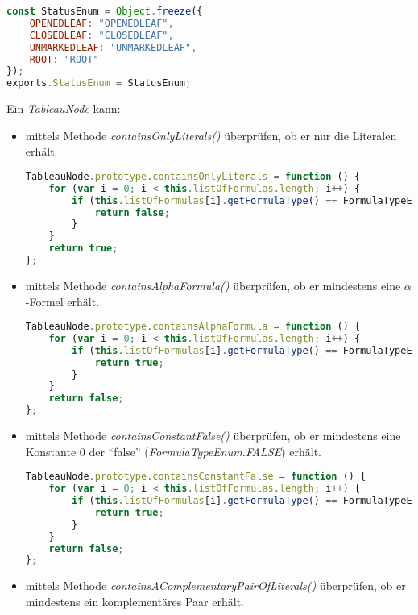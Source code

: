 \begin{lstlisting}[language=JavaScript, caption= StatusEnum, basicstyle=\scriptsize]
const StatusEnum = Object.freeze({
    OPENEDLEAF: "OPENEDLEAF",
    CLOSEDLEAF: "CLOSEDLEAF",
    UNMARKEDLEAF: "UNMARKEDLEAF",
    ROOT: "ROOT"
});
exports.StatusEnum = StatusEnum;
\end{lstlisting}

Ein \textit{TableauNode} kann:
\begin{itemize}
\item	mittels Methode \textit{containsOnlyLiterals()} überprüfen, ob er nur die Literalen erhält.
\begin{lstlisting}[language=JavaScript, caption= containsOnlyLiterals() (Klasse TableauNode), basicstyle=\scriptsize]
TableauNode.prototype.containsOnlyLiterals = function () {
    for (var i = 0; i < this.listOfFormulas.length; i++) {
        if (this.listOfFormulas[i].getFormulaType() == FormulaTypeEnum.ALPHA || this.listOfFormulas[i].getFormulaType() == FormulaTypeEnum.BETA) {
            return false;
        }
    }
    return true;
};
\end{lstlisting}
\item	mittels Methode \textit{containsAlphaFormula()} überprüfen, ob er mindestens eine $\alpha$-Formel erhält. 
\begin{lstlisting}[language=JavaScript, caption= containsAlphaFormula() (Klasse TableauNode), basicstyle=\scriptsize] 
TableauNode.prototype.containsAlphaFormula = function () {
    for (var i = 0; i < this.listOfFormulas.length; i++) {
        if (this.listOfFormulas[i].getFormulaType() == FormulaTypeEnum.ALPHA) {
            return true;
        }
    }
    return false;
};
\end{lstlisting}
\item	mittels Methode \textit{containsConstantFalse()} überprüfen, ob er mindestens eine Konstante 0 der ``false'' (\textit{FormulaTypeEnum.FALSE})  erhält. 
\begin{lstlisting}[language=JavaScript, caption= containsConstantFalse() (Klasse TableauNode), basicstyle=\scriptsize] 
TableauNode.prototype.containsConstantFalse = function () {
    for (var i = 0; i < this.listOfFormulas.length; i++) {
        if (this.listOfFormulas[i].getFormulaType() == FormulaTypeEnum.FALSE) {
            return true;
        }
    }
    return false;
};
\end{lstlisting}
\item	mittels Methode \textit{containsAComplementaryPairOfLiterals()} überprüfen, ob er mindestens ein komplementäres Paar erhält. 

\end{itemize}
